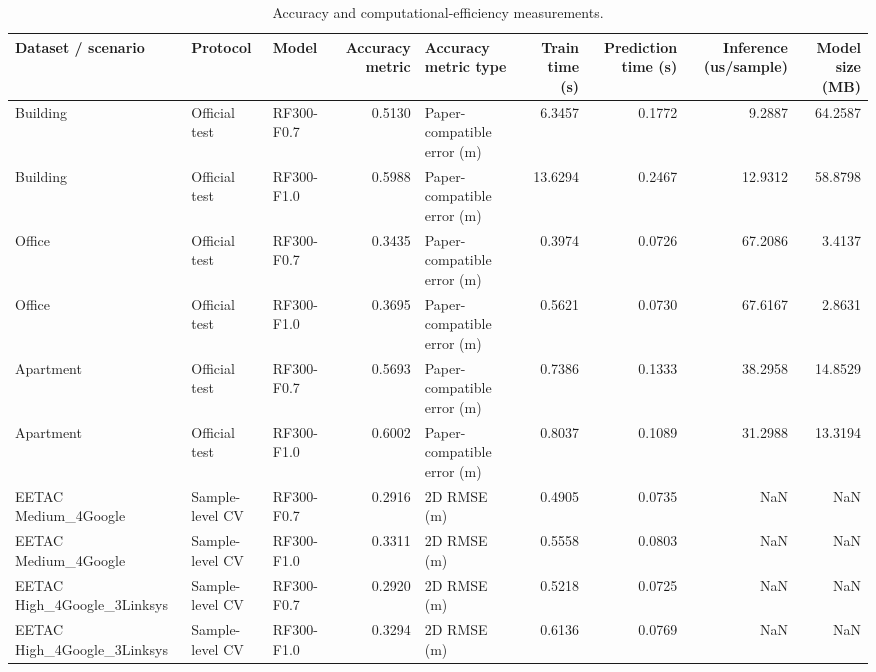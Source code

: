 \begin{table}
\caption{Accuracy and computational-efficiency measurements.}
\label{tab:efficiency}
\begin{tabular}{lllrlrrrr}
\toprule
Dataset / scenario & Protocol & Model & Accuracy metric & Accuracy metric type & Train time (s) & Prediction time (s) & Inference (us/sample) & Model size (MB) \\
\midrule
Building & Official test & RF300-F0.7 & 0.5130 & Paper-compatible error (m) & 6.3457 & 0.1772 & 9.2887 & 64.2587 \\
Building & Official test & RF300-F1.0 & 0.5988 & Paper-compatible error (m) & 13.6294 & 0.2467 & 12.9312 & 58.8798 \\
Office & Official test & RF300-F0.7 & 0.3435 & Paper-compatible error (m) & 0.3974 & 0.0726 & 67.2086 & 3.4137 \\
Office & Official test & RF300-F1.0 & 0.3695 & Paper-compatible error (m) & 0.5621 & 0.0730 & 67.6167 & 2.8631 \\
Apartment & Official test & RF300-F0.7 & 0.5693 & Paper-compatible error (m) & 0.7386 & 0.1333 & 38.2958 & 14.8529 \\
Apartment & Official test & RF300-F1.0 & 0.6002 & Paper-compatible error (m) & 0.8037 & 0.1089 & 31.2988 & 13.3194 \\
EETAC Medium\_4Google & Sample-level CV & RF300-F0.7 & 0.2916 & 2D RMSE (m) & 0.4905 & 0.0735 & NaN & NaN \\
EETAC Medium\_4Google & Sample-level CV & RF300-F1.0 & 0.3311 & 2D RMSE (m) & 0.5558 & 0.0803 & NaN & NaN \\
EETAC High\_4Google\_3Linksys & Sample-level CV & RF300-F0.7 & 0.2920 & 2D RMSE (m) & 0.5218 & 0.0725 & NaN & NaN \\
EETAC High\_4Google\_3Linksys & Sample-level CV & RF300-F1.0 & 0.3294 & 2D RMSE (m) & 0.6136 & 0.0769 & NaN & NaN \\
\bottomrule
\end{tabular}
\end{table}
